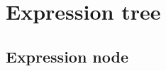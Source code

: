 \section{Expression tree}
\label{sec:exprtree}





% 

\subsection{Expression node}
\label{subsec:exprnode}

\iffalse
- expression tree is actually and acyclic directed graph with root nodes and multiple connected components
- explain dependencies between columns on evaluation (to evaluate a columns you need to also evaluate some other columns in the same connected component)
\fi


